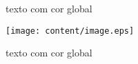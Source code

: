 
\begin{slide-frame}
\begin{book-box}texto com cor global\end{book-box}
\lipsum[1][1-2]
\end{slide-frame}

\begin{slide-frame}
\centering
\lipsum[1][1-3]
\texttt{[image: content/image.eps]}
\begin{book-box}texto com cor global\end{book-box}
\end{slide-frame}
